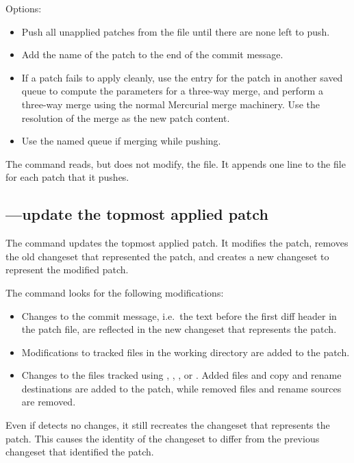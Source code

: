Options:
\begin{itemize}
\item[\hgopt{qpush}{-a}] Push all unapplied patches from the
   file until there are none left to push.
\item[\hgopt{qpush}{-l}] Add the name of the patch to the end
  of the commit message.
\item[\hgopt{qpush}{-m}] If a patch fails to apply cleanly, use the
  entry for the patch in another saved queue to compute the parameters
  for a three-way merge, and perform a three-way merge using the
  normal Mercurial merge machinery.  Use the resolution of the merge
  as the new patch content.
\item[\hgopt{qpush}{-n}] Use the named queue if merging while pushing.
\end{itemize}

The  command reads, but does not modify, the
 file.  It appends one line to the 
file for each patch that it pushes.

\subsection{---update the topmost applied patch}

The  command updates the topmost applied patch.  It
modifies the patch, removes the old changeset that represented the
patch, and creates a new changeset to represent the modified patch.

The  command looks for the following modifications:
\begin{itemize}
\item Changes to the commit message, i.e.~the text before the first
  diff header in the patch file, are reflected in the new changeset
  that represents the patch.
\item Modifications to tracked files in the working directory are
  added to the patch.
\item Changes to the files tracked using , ,
  , or .  Added files and copy and rename
  destinations are added to the patch, while removed files and rename
  sources are removed.
\end{itemize}

Even if  detects no changes, it still recreates the
changeset that represents the patch.  This causes the identity of the
changeset to differ from the previous changeset that identified the
patch.


